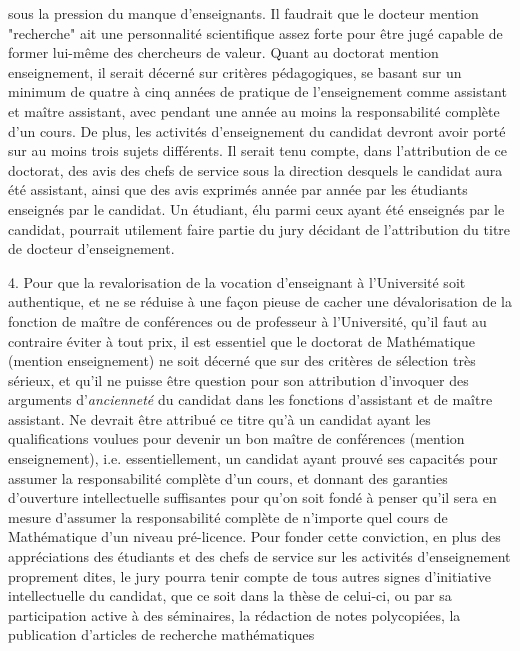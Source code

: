 \documentclass[11pt,a4paper]{article}
\begin{document}

sous la pression du manque d'enseignants. Il faudrait que le docteur mention "recherche" ait une personnalité scientifique assez forte pour être jugé capable de former lui-même des chercheurs de valeur. Quant au doctorat mention enseignement, il serait décerné sur critères pédagogiques, se basant sur un minimum de quatre à cinq années de pratique de l'enseignement comme assistant et maître assistant, avec pendant une année au moins la responsabilité complète d'un cours. De plus, les activités d'enseignement du candidat devront avoir porté sur au moins trois sujets différents. Il serait tenu compte, dans l'attribution de ce doctorat, des avis des chefs de service sous la direction desquels le candidat aura été assistant, ainsi que des avis exprimés année par année par les étudiants enseignés par le candidat. Un étudiant, élu parmi ceux ayant été enseignés par le candidat, pourrait utilement faire partie du jury décidant de l'attribution du titre de docteur d'enseignement.

4. Pour que la revalorisation de la vocation d'enseignant à l'Université soit authentique, et ne se réduise à une façon pieuse de cacher une dévalorisation de la fonction de maître de conférences ou de professeur à l'Université, qu'il faut au contraire éviter à tout prix, il est essentiel que le doctorat de Mathématique (mention enseignement) ne soit décerné que sur des critères de sélection très sérieux, et qu'il ne puisse être question pour son attribution d'invoquer des arguments d'\emph{ancienneté} du candidat dans les fonctions d'assistant et de maître assistant. Ne devrait être attribué ce titre qu'à un candidat ayant les qualifications voulues pour devenir un bon maître de conférences (mention enseignement), i.e. essentiellement, un candidat ayant prouvé ses capacités pour assumer la responsabilité complète d'un cours, et donnant des garanties d'ouverture intellectuelle suffisantes pour qu'on soit fondé à penser qu'il sera en mesure d'assumer la responsabilité complète de n'importe quel cours de Mathématique d'un niveau pré-licence. Pour fonder cette conviction, en plus des appréciations des étudiants et des chefs de service sur les activités d'enseignement proprement dites, le jury pourra tenir compte de tous autres signes d'initiative intellectuelle du candidat, que ce soit dans la thèse de celui-ci, ou par sa participation active à des séminaires, la rédaction de notes polycopiées, la publication d'articles de recherche mathématiques
\end{document}
